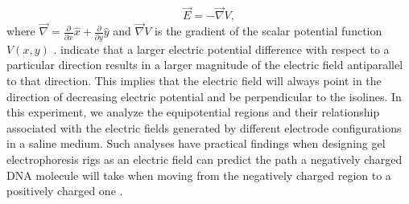 \documentclass[10pt,journal,twoside]{IEEEtran}
\begin{document}
\begin{equation}
\vec{E} = -\vec{\nabla}{V},
\label{eq:2}
\end{equation}
where $\vec{\nabla}=\frac{\partial}{\partial x}\hat{x}+\frac{\partial}{\partial y}\hat{y}$ and $\vec{\nabla}{V}$ is the gradient of the scalar potential function $V(x,y)$ \cite{tipler,stewart}.  indicate that a larger electric potential difference with respect to a particular direction results in a larger magnitude of the electric field antiparallel to that direction. This implies that the electric field will always point in the direction of decreasing electric potential and be perpendicular to the isolines. In this experiment, we analyze the equipotential regions and their relationship associated with the electric fields generated by different electrode configurations in a saline medium. Such analyses have practical findings when designing gel electrophoresis rigs as an electric field can predict the path a negatively charged DNA molecule will take when moving from the negatively charged region to a positively charged one \cite{tipler,campbell}. 
\end{document}
